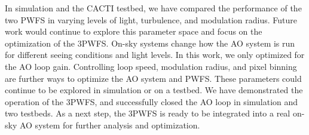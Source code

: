In simulation and the CACTI testbed, we have compared the performance of the two PWFS in varying levels of light, turbulence, and modulation radius. Future work would continue to explore this parameter space and focus on the optimization of the 3PWFS. On-sky systems change how the AO system is run for different seeing conditions and light levels. In this work, we only optimized for the AO loop gain. Controlling loop speed, modulation radius, and pixel binning are further ways to optimize the AO system and PWFS. These parameters could continue to be explored in simulation or on a testbed. We have demonstrated the operation of the 3PWFS, and successfully closed the AO loop in simulation and two testbeds. As a next step, the 3PWFS is ready to be integrated into a real on-sky AO system for further analysis and optimization.

